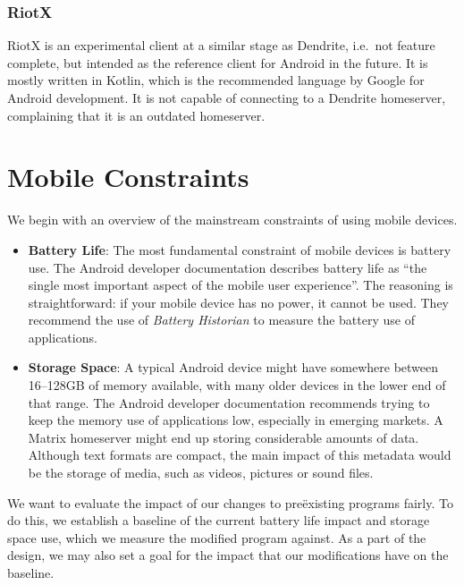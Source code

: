 \subsubsection{RiotX}
RiotX is an experimental client at a similar stage as Dendrite, i.e.~not feature complete, but intended as the reference client for Android in the future.
It is mostly written in Kotlin, which is the recommended language by Google for Android development.
It is not capable of connecting to a Dendrite homeserver, complaining that it is an outdated homeserver.

\section{Mobile Constraints}\label{sec:mobile_constraints}
We begin with an overview of the mainstream constraints of using mobile devices.

\begin{itemize}
	\item{
	      \textbf{Battery Life}:
	      The most fundamental constraint of mobile devices is battery use.
	      The Android developer documentation describes battery life as ``the single most important aspect of the mobile user experience''\cite{android_devdocs_power}.
	      The reasoning is straightforward: if your mobile device has no power, it cannot be used.
	      They recommend the use of \textit{Battery Historian}\cite{battery_historian} to measure the battery use of applications.
	      }
	\item{
	      \textbf{Storage Space}:
	      A typical Android device might have somewhere between 16--128GB of memory available, with many older devices in the lower end of that range.
	      The Android developer documentation recommends trying to keep the memory use of applications low, especially in emerging markets\cite{android_devdocs_apksize}.
	      A Matrix homeserver might end up storing considerable amounts of data.
	      Although text formats are compact, the main impact of this metadata would be the storage of media, such as videos, pictures or sound files.
	      }
\end{itemize}

We want to evaluate the impact of our changes to preëxisting programs fairly.
To do this, we establish a baseline of the current battery life impact and storage space use, which we measure the modified program against.
As a part of the design, we may also set a goal for the impact that our modifications have on the baseline.

